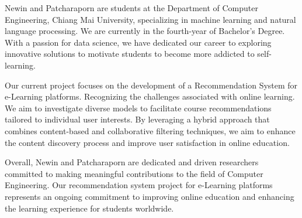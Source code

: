 \documentclass[final,isne,project]{cpecmu}
\begin{document}
\begin{biosketch}
\textsf{Newin and Patcharaporn are students at the Department of Computer 
Engineering, Chiang Mai University, specializing in machine learning 
and natural language processing. We are currently in the fourth-year 
of Bachelor's Degree. With a passion for data science, we have dedicated 
our career to exploring innovative solutions to motivate students to 
become more addicted to self-learning.}

\textsf{Our current project focuses on the development of a Recommendation 
System for e-Learning platforms. Recognizing the challenges associated 
with online learning. We aim to investigate diverse models to facilitate 
course recommendations tailored to individual user interests. By leveraging 
a hybrid approach that combines content-based and collaborative filtering 
techniques, we aim to enhance the content discovery process and improve user 
satisfaction in online education.}

\textsf{Overall, Newin and Patcharaporn are dedicated and driven researchers 
committed to making meaningful contributions to the field of Computer 
Engineering. Our recommendation system project for e-Learning 
platforms represents an ongoing commitment to improving online 
education and enhancing the learning experience for students worldwide.}




\end{biosketch}

\fi
\end{document}
